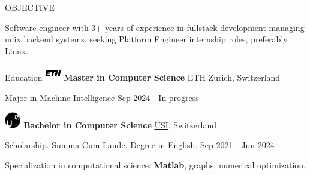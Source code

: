 \documentclass{cv} %
\def\intraexpvspace{0.15cm}
\begin{document}
\begin{minipage}[b][0.9\paperheight][t]{0.7\linewidth}

    \headline

    \begin{rSection}{OBJECTIVE}
        \item Software engineer with 3+ years of experience in fullstack development 
        managing unix backend systems,
        seeking Platform Engineer internship roles, preferably Linux.
    \end{rSection}

    \begin{rSection}{Education}
        \vspace{0.2cm}
        \includegraphics[width=0.7cm, trim={0cm 3cm 0cm 0cm}]{ethz-icon.png}
        {\bf Master in Computer Science}
        \hfill \href{https://ethz.ch/en.html}{ETH Zurich}, Switzerland
        \item \hspace{0.85cm}Major in Machine Intelligence%
        \hfill {Sep 2024 - In progress}
        \vspace{\intraexpvspace}
        \vspace{\intraexpvspace}

        \includegraphics[width=0.7cm, trim={0cm 10cm 0cm 0cm}]{usi-icon.png}
        {\bf Bachelor in Computer Science}
        \hfill \href{https://www.usi.ch/en}{USI}, Switzerland
        \item \hspace{0.85cm}Scholarship. Summa Cum Laude. Degree in English. %
        \hfill {Sep 2021 - Jun 2024}
        \item Specialization in computational science: \textbf{Matlab}, graphs, numerical optimization.
        \vspace{\intraexpvspace}
        \vspace{\intraexpvspace}


\end{rSection}
\end{minipage}
\end{document}
